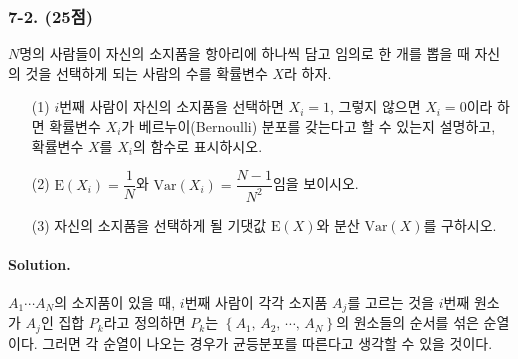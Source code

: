 \subsubsection{7-2. (25점)} $N$명의 사람들이 자신의 소지품을 항아리에 하나씩 담고 임의로 한 개를 뽑을 때 자신의 것을 선택하게 되는 사람의 수를 확률변수 $X$라 하자.
\begin{itemize}
	\item [(1)] $i$번째 사람이 자신의 소지품을 선택하면 $X_i = 1$, 그렇지 않으면 $X_i = 0$이라 하면 확률변수 $X_i$가 베르누이(Bernoulli) 분포를 갖는다고 할 수 있는지 설명하고, 확률변수 $X$를 $X_i$의 함수로 표시하시오.
	\item [(2)] $\mathrm{E}\left(X_i\right) = \dfrac{1}{N}$와 $\mathrm{Var}\left(X_i\right) = \dfrac{N - 1}{N^2}$임을 보이시오.
	\item [(3)] 자신의 소지품을 선택하게 될 기댓값 $\mathrm{E}\left(X\right)$와 분산 $\mathrm{Var}\left(X\right)$를 구하시오.
\end{itemize}

\paragraph{Solution.} $A_1 \cdots A_N$의 소지품이 있을 때, $i$번째 사람이 각각 소지품 $A_j$를 고르는 것을 $i$번째 원소가 $A_j$인 집합 $P_k$라고 정의하면
$P_k$는 $\left\{A_1,\, A_2,\, \cdots,\, A_N\right\}$의 원소들의 순서를 섞은 순열이다. 그러면 각 순열이 나오는 경우가 균등분포를 따른다고 생각할 수 있을 것이다.

